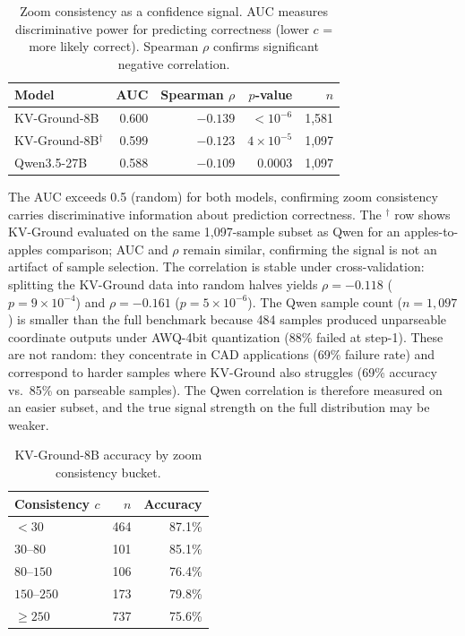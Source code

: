 \documentclass{article}
\begin{document}
\begin{table}[h]
\centering
\caption{Zoom consistency as a confidence signal. AUC measures discriminative power for predicting correctness (lower $c$ = more likely correct). Spearman $\rho$ confirms significant negative correlation.}
\label{tab:correlation}
\begin{tabular}{lrrrr}
\toprule
\textbf{Model} & \textbf{AUC} & \textbf{Spearman $\rho$} & \textbf{$p$-value} & \textbf{$n$} \\
\midrule
KV-Ground-8B & 0.600 & $-0.139$ & $< 10^{-6}$ & 1,581 \\
KV-Ground-8B$^\dagger$ & 0.599 & $-0.123$ & $4 \times 10^{-5}$ & 1,097 \\
Qwen3.5-27B & 0.588 & $-0.109$ & $0.0003$ & 1,097 \\
\bottomrule
\end{tabular}
\end{table}

The AUC exceeds 0.5 (random) for both models, confirming zoom consistency carries discriminative information about prediction correctness. The $^\dagger$ row shows KV-Ground evaluated on the same 1,097-sample subset as Qwen for an apples-to-apples comparison; AUC and $\rho$ remain similar, confirming the signal is not an artifact of sample selection. The correlation is stable under cross-validation: splitting the KV-Ground data into random halves yields $\rho = -0.118$ ($p = 9 \times 10^{-4}$) and $\rho = -0.161$ ($p = 5 \times 10^{-6}$). The Qwen sample count ($n = 1{,}097$) is smaller than the full benchmark because 484 samples produced unparseable coordinate outputs under AWQ-4bit quantization (88\% failed at step-1). These are not random: they concentrate in CAD applications (69\% failure rate) and correspond to harder samples where KV-Ground also struggles (69\% accuracy vs.\ 85\% on parseable samples). The Qwen correlation is therefore measured on an easier subset, and the true signal strength on the full distribution may be weaker.

\begin{table}[h]
\centering
\caption{KV-Ground-8B accuracy by zoom consistency bucket.}
\label{tab:buckets}
\begin{tabular}{lrr}
\toprule
\textbf{Consistency $c$} & \textbf{$n$} & \textbf{Accuracy} \\
\midrule
$< 30$ & 464 & 87.1\% \\
$30$--$80$ & 101 & 85.1\% \\
$80$--$150$ & 106 & 76.4\% \\
$150$--$250$ & 173 & 79.8\% \\
$\geq 250$ & 737 & 75.6\% \\
\bottomrule
\end{tabular}
\end{table}
\end{document}
